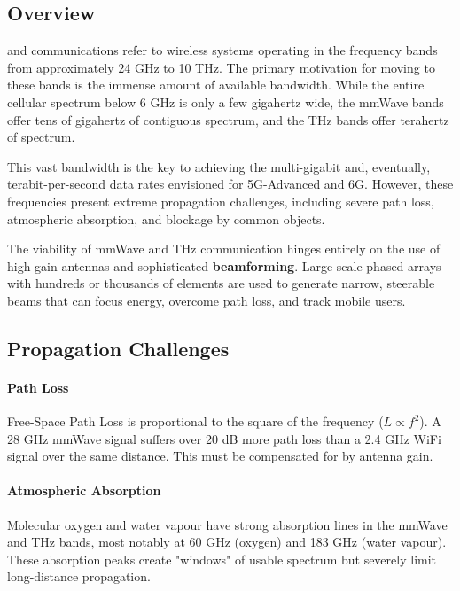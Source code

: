 \subsection{Overview}

 and  communications refer to wireless systems operating in the frequency bands from approximately 24 GHz to 10 THz. The primary motivation for moving to these bands is the immense amount of available bandwidth. While the entire cellular spectrum below 6 GHz is only a few gigahertz wide, the mmWave bands offer tens of gigahertz of contiguous spectrum, and the THz bands offer terahertz of spectrum.

This vast bandwidth is the key to achieving the multi-gigabit and, eventually, terabit-per-second data rates envisioned for 5G-Advanced and 6G. However, these frequencies present extreme propagation challenges, including severe path loss, atmospheric absorption, and blockage by common objects.

\begin{keyconcept}
    The viability of mmWave and THz communication hinges entirely on the use of high-gain antennas and sophisticated \textbf{beamforming}. Large-scale phased arrays with hundreds or thousands of elements are used to generate narrow, steerable beams that can focus energy, overcome path loss, and track mobile users.
\end{keyconcept}


\subsection{Propagation Challenges}

\paragraph{Path Loss}
Free-Space Path Loss is proportional to the square of the frequency ($L \propto f^2$). A 28 GHz mmWave signal suffers over 20 dB more path loss than a 2.4 GHz WiFi signal over the same distance. This must be compensated for by antenna gain.

\paragraph{Atmospheric Absorption}
Molecular oxygen and water vapour have strong absorption lines in the mmWave and THz bands, most notably at 60 GHz (oxygen) and 183 GHz (water vapour). These absorption peaks create "windows" of usable spectrum but severely limit long-distance propagation.

